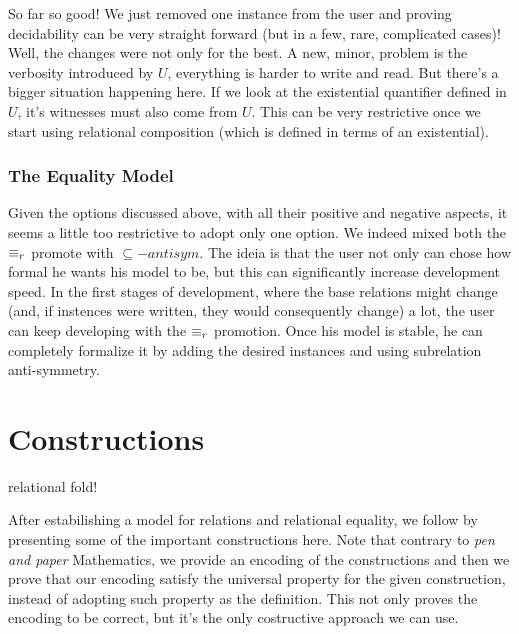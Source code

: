   
  So far so good! We just removed one instance from the user and proving decidability can be very
  straight forward (but in a few, rare, complicated cases)! Well, the changes were not only for the best.
  A new, minor, problem is the verbosity introduced by $U$, everything is harder to write and read.
  But there's a bigger situation happening here. If we look at the existential quantifier defined in $U$,
  it's witnesses must also come from $U$. This can be very restrictive once we start using relational
  composition (which is defined in terms of an existential).

\subsubsection{The Equality Model}
  
  Given the options discussed above, with all their positive and negative aspects, it seems
  a little too restrictive to adopt only one option. We indeed mixed both the $\equiv_r$ promote
  with $\subseteq-antisym$. The ideia is that the user not only can chose how formal he wants his model
  to be, but this can significantly increase development speed. In the first stages of development, where
  the base relations might change (and, if instences were written, they would consequently change) a lot,
  the user can keep developing with the $\equiv_r$ promotion. Once his model is stable, he can completely
  formalize it by adding the desired instances and using subrelation anti-symmetry.

\section{Constructions}

\begin{TODO}
  \item relational fold!
\end{TODO}

After estabilishing a model for relations and relational equality, we follow by presenting
some of the important constructions here. Note that contrary to \emph{pen and paper} Mathematics,
we provide an encoding of the constructions and then we prove that our encoding satisfy the
universal property for the given construction, instead of adopting such property as the
definition. This not only proves the encoding to be correct, but it's the only costructive approach
we can use.

